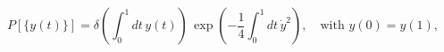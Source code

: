 \begin{equation}
P[\{ y(t)\}]=\delta\left( \int_0^1 dt\, y(t) \right) \, \exp \left(
-\frac{1}{4} \int_0^1 dt\, \dot{y}^2\right), \quad \text{with}\,\,
y(0)=y(1), \label{wn1}
\end{equation}

